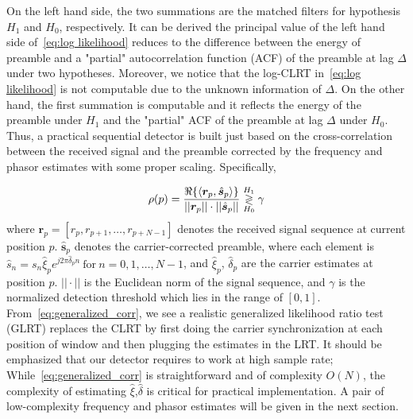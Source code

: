 On the left hand side, the two summations are the matched filters for hypothesis $H_1$
and $H_0$, respectively. It can be derived the principal value of the left hand side of~\eqref{eq:log likelihood}
reduces to the difference between the energy of preamble and a "partial" autocorrelation function (ACF)
of the preamble at lag $\Delta$ under two hypotheses. Moreover, we notice that the log-CLRT in~\eqref{eq:log likelihood}
is not computable due to the unknown information of $\Delta$. On the other hand,
the first summation is computable and it reflects the energy of the preamble
under $H_1$ and the "partial" ACF of the preamble at lag $\Delta$ under $H_0$.
Thus, a practical sequential detector is built just based on the
cross-correlation between the received signal
and the preamble corrected by the frequency and phasor estimates with some proper scaling. Specifically,

\begin{equation}
  \label{eq:generalized_corr}
  \rho(p)=
  \frac{\Re\{\langle
    \bm{r}_{p},\hat{\bm{s}}_{p}\rangle\}}
  {||\bm{r}_{p}||\cdot||\hat{\bm{s}}_{p}||} \mathrel{\mathop\gtrless\limits^{H_1}_{H_0}} \gamma
\end{equation}
where $\bm{r}_{p}{=}[r_{p},r_{p+1},\ldots,r_{p+N-1}]$ denotes the received signal sequence at
current position $p$. $\hat{\bm{s}}_{p}$ denotes the carrier-corrected preamble, where each element is
$\hat{s}_{n}=s_n\hat{\xi}_{p}e^{j2\pi\hat{\delta}_{p}n}~\text{for}~n=0,1,\ldots,N-1$,
and $\hat{\xi}_{p}$, $\hat{\delta}_{p}$ are the carrier estimates at position $p$.
$||\cdot||$ is the Euclidean norm of the signal sequence,
and $\gamma$ is the normalized detection threshold which lies in the range of $[0,1]$. 
From~\eqref{eq:generalized_corr}, we see
a realistic generalized likelihood ratio test (GLRT) replaces the CLRT
by first doing the carrier synchronization at each position of window and 
then plugging the estimates in the LRT. It should 
be emphasized that our detector requires to work at high sample rate;
While~\eqref{eq:generalized_corr}
is straightforward and of complexity $O(N)$, the complexity of estimating $\hat{\xi}$,$\hat{\delta}$
is critical for practical implementation. 
A pair of low-complexity frequency and phasor estimates will be given in the next section.



